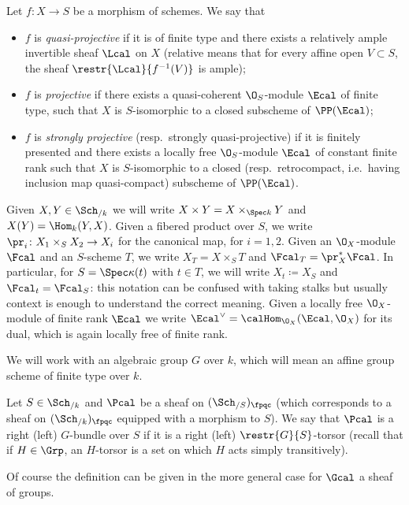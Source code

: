         \begin{defn}
            \label{defn:projective_ega}
            Let $f\colon X \to S$ be a morphism of schemes. We say that 
            \begin{itemize}
                \item $f$ is \emph{quasi-projective} if it is of finite type and there exists a relatively ample invertible sheaf $\Lcal$ on $X$ (relative means that for every affine open $V \subset S$, the sheaf $\restr{\Lcal}{f^{-1}(V)}$ is ample);
                \item $f$ is \emph{projective} if there exists a quasi-coherent $\O_S$-module $\Ecal$ of finite type, such that $X$ is $S$-isomorphic to a closed subscheme of $\PP(\Ecal)$;
                \item $f$ is \emph{strongly projective} (resp.\ strongly quasi-projective) if it is finitely presented and there exists a locally free $\O_S$-module $\Ecal$ of constant finite rank such that $X$ is $S$-isomorphic to a closed (resp.\ retrocompact, i.e.\ having inclusion map quasi-compact) subscheme of $\PP(\Ecal)$.
            \end{itemize} 
        \end{defn}

        Given $X, Y \in \Sch_{/k}$ we will write $X \times Y = X \times_{\Spec k} Y$ and $X(Y) = \Hom_k(Y, X)$. Given a fibered product over $S$, we write $\pr_i\colon X_1 \times_S X_2 \to X_i$ for the canonical map, for $i = 1, 2$. Given an $\O_X$-module $\Fcal$ and an $S$-scheme $T$, we write $X_T = X \times_S T$ and $\Fcal_T = \pr_X^*\Fcal$.\newline
        In particular, for $S = \Spec \kappa(t)$ with $t \in T$, we will write $X_t \coloneqq X_S$ and $\Fcal_t = \Fcal_S$: this notation can be confused with taking stalks but usually context is enough to understand the correct meaning. Given a locally free $\O_X$-module of finite rank $\Ecal$ we write $\Ecal^{\vee} = \calHom_{\O_X}(\Ecal, \O_X)$ for its dual, which is again locally free of finite rank.

        We will work with an algebraic group $G$ over $k$, which will mean an affine group scheme of finite type over $k$.

        \begin{defn}
            \label{defn:g_bundle_general_def}
            Let $S \in \Sch_{/k}$ and $\Pcal$ be a sheaf on $(\Sch_{/S})_{\fpqc}$ (which corresponds to a sheaf on $(\Sch_{/k})_{\fpqc}$ equipped with a morphism to $S$). We say that $\Pcal$ is a right (left) $G$-bundle over $S$ if it is a right (left) $\restr{G}{S}$-torsor (recall that if $H \in \Grp$, an $H$-torsor is a set on which $H$ acts simply transitively).
        \end{defn}
        Of course the definition can be given in the more general case for $\Gcal$ a sheaf of groups.

